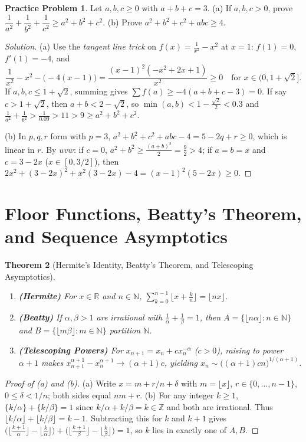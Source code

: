 \documentclass[11pt]{article}
\theoremstyle{plain}
\newtheorem{theorem}{Theorem}[section]
\theoremstyle{definition}
\newtheorem{problem}[theorem]{Practice Problem}
\newenvironment{solution}{\begin{proof}[Solution]}{\end{proof}}
\newcommand{\ZZ}{\mathbb{Z}}
\newcommand{\RR}{\mathbb{R}}
\newcommand{\NN}{\mathbb{N}}
\begin{document}
\begin{problem}
Let $a,b,c \ge 0$ with $a+b+c = 3$.
(a) If $a,b,c > 0$, prove $\dfrac{1}{a^2} + \dfrac{1}{b^2} + \dfrac{1}{c^2} \ge a^2+b^2+c^2$.
(b) Prove $a^2+b^2+c^2+abc \ge 4$.
\end{problem}
\begin{solution}
(a) Use the \emph{tangent line trick} on $f(x) = \frac1{x^2}-x^2$ at $x = 1$:
$f(1)=0$, $f'(1) = -4$, and
\[
\frac{1}{x^2} - x^2 - \bigl(-4(x-1)\bigr) = \frac{(x-1)^2(-x^2+2x+1)}{x^2} \ge 0 \quad \text{for } x \in (0, 1+\sqrt{2}].
\]
If $a,b,c \le 1+\sqrt2$, summing gives $\sum f(a) \ge -4(a+b+c-3) = 0$. If say $c > 1+\sqrt2$, then $a+b < 2-\sqrt2$, so $\min(a,b) < 1-\frac{\sqrt2}{2} < 0.3$ and $\frac1{a^2}+\frac1{b^2} > \frac{1}{0.09} > 11 > 9 \ge a^2+b^2+c^2$.

(b) In $p,q,r$ form with $p=3$, $a^2+b^2+c^2+abc-4 = 5 - 2q + r \ge 0$, which is linear in $r$. By $uvw$: if $c=0$, $a^2+b^2 \ge \frac{(a+b)^2}{2} = \frac{9}{2} > 4$; if $a=b=x$ and $c=3-2x$ ($x\in[0,3/2]$), then $2x^2+(3-2x)^2+x^2(3-2x)-4 = (x-1)^2(5-2x) \ge 0$.
\end{solution}

\section{Floor Functions, Beatty's Theorem, and Sequence Asymptotics}

\begin{theorem}[Hermite's Identity, Beatty's Theorem, and Telescoping Asymptotics]
\leavevmode
\begin{enumerate}[label=(\alph*)]
\item \textbf{(Hermite)} For $x \in \RR$ and $n \in \NN$, $\sum_{k=0}^{n-1}\lfloor x + \frac{k}{n}\rfloor = \lfloor nx \rfloor$.
\item \textbf{(Beatty)} If $\alpha, \beta > 1$ are irrational with $\frac{1}{\alpha}+\frac{1}{\beta}=1$, then $A = \{\lfloor n\alpha\rfloor : n\in\NN\}$ and $B = \{\lfloor m\beta\rfloor : m\in\NN\}$ partition $\NN$.
\item \textbf{(Telescoping Powers)} For $x_{n+1} = x_n + c x_n^{-\alpha}$ ($c>0$), raising to power $\alpha+1$ makes $x_{n+1}^{\alpha+1} - x_n^{\alpha+1} \to (\alpha+1)c$, yielding $x_n \sim \bigl((\alpha+1)cn\bigr)^{1/(\alpha+1)}$.
\end{enumerate}
\end{theorem}
\begin{proof}[Proof of (a) and (b)]
(a) Write $x = m + r/n + \delta$ with $m=\lfloor x\rfloor$, $r\in\{0,\dots,n-1\}$, $0\le\delta < 1/n$; both sides equal $nm+r$.
(b) For any integer $k \ge 1$, $\{k/\alpha\} + \{k/\beta\} = 1$ since $k/\alpha + k/\beta = k \in \ZZ$ and both are irrational. Thus $\lfloor k/\alpha \rfloor + \lfloor k/\beta \rfloor = k-1$. Subtracting this for $k$ and $k+1$ gives $\bigl(\lfloor\frac{k+1}{\alpha}\rfloor - \lfloor\frac{k}{\alpha}\rfloor\bigr) + \bigl(\lfloor\frac{k+1}{\beta}\rfloor - \lfloor\frac{k}{\beta}\rfloor\bigr) = 1$, so $k$ lies in exactly one of $A, B$.
\end{proof}
\end{document}
